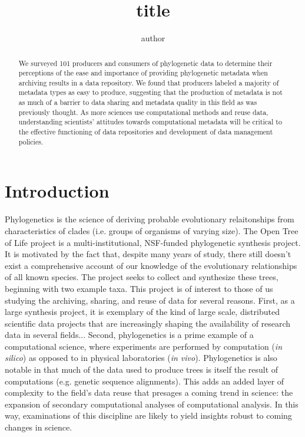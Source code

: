 \documentclass[12pt]{scrartcl}
\title{title}
\author{author}
\begin{document}
%
%

\maketitle
\thispagestyle{fancy}



\begin{abstract}
We surveyed 101 producers and consumers of phylogenetic data to determine their perceptions of the ease and importance of providing phylogenetic metadata when archiving results in a data repository.  We found that producers labeled a majority of metadata types as easy to produce, suggesting that the production of metadata is not as much of a barrier to data sharing and metadata quality in this field as was previously thought.  
As more sciences use computational methods and reuse data, understanding scientists' attitudes towards computational metadata will be critical to the effective functioning of data repositories and development of data management policies.
\end{abstract}


\section{Introduction}
Phylogenetics is the science of deriving probable evolutionary relaitonships from characteristics of clades (i.e. groups of organisms of varying size).  
The Open Tree of Life project %
is a multi-institutional, NSF-funded phylogenetic synthesis project.  It is motivated by the fact that, despite many years of study, there still doesn't exist a comprehensive account of our knowledge of the evolutionary relationships of all known species.  The project seeks to collect and synthesize these trees, beginning with two example taxa.
This project is of interest to those of us studying the archiving, sharing, and reuse of data for several reasons.  First, as a large synthesis project, it is exemplary of the kind of large scale, distributed scientific data projects that are increasingly shaping the availability of research data in several fields... %
Second, phylogenetics is a prime example of a computational science, where experiments are performed by computation (\textit{in silico}) as opposed to in physical laboratories (\textit{in vivo}).  Phylogenetics is also notable in that much of the data used to produce trees is itself the result of computations (e.g. genetic sequence alignments).  This adds an added layer of complexity to the field's data reuse that presages a coming trend in science: the expansion of secondary computational analyses of computational analysis.  In this way, examinations of this discipline are likely to yield insights robust to coming changes in science.
\end{document}
